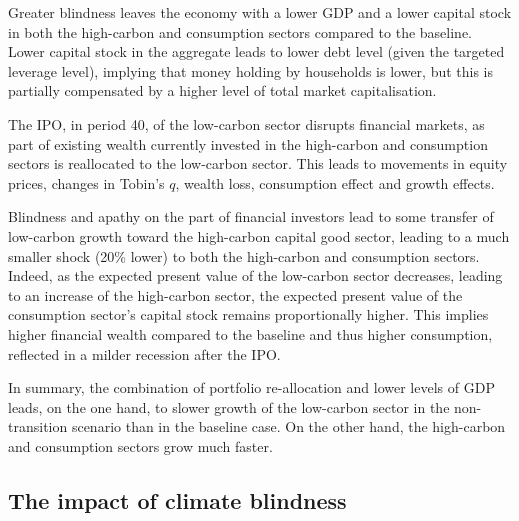 \documentclass[authoryear]{article}
\begin{document}
Greater blindness leaves the economy with a lower GDP and a lower capital stock in both the high-carbon and consumption sectors compared to the baseline. Lower capital stock in the aggregate leads to lower debt level (given the targeted leverage level), implying that money holding by households is lower, but this is partially compensated by a higher level of total market capitalisation.

The IPO, in period 40, of the low-carbon sector disrupts financial markets, as part of existing wealth currently invested in the high-carbon and consumption sectors is reallocated to the low-carbon sector. This leads to movements in equity prices, changes in Tobin's $q$, wealth loss, consumption effect and growth effects.

Blindness and apathy on the part of financial investors lead to some transfer of low-carbon growth toward the high-carbon capital good sector, leading to a much smaller shock (20\% lower) to both the high-carbon and consumption sectors. Indeed, as the expected present value of the low-carbon sector decreases, leading to an increase of the high-carbon sector, the expected present value of the consumption sector's capital stock remains proportionally higher. This implies higher financial wealth compared to the baseline and thus higher consumption, reflected in a milder recession after the IPO.

In summary, the combination of portfolio re-allocation and lower levels of GDP leads, on the one hand, to slower growth of the low-carbon sector in the non-transition scenario than in the baseline case. On the other hand, the high-carbon and consumption sectors grow much faster.

\subsection{The impact of climate blindness}
\label{sec:blindsim}
\end{document}
